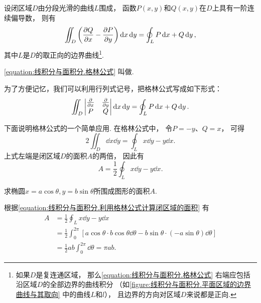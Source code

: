 \begin{theorem}[格林公式]
设闭区域\(D\)由分段光滑的曲线\(L\)围成，
函数\(P(x,y)\)和\(Q(x,y)\)在\(D\)上具有一阶连续偏导数，
则有
\begin{equation}\label{equation:线积分与面积分.格林公式}
	\iint_D \left( \pdv{Q}{x} - \pdv{P}{y} \right) \dd{x}\dd{y}
	= \oint_L P\dd{x} + Q\dd{y},
\end{equation}
其中\(L\)是\(D\)的取正向的边界曲线\footnote{%
如果\(D\)是复连通区域，
那么\cref{equation:线积分与面积分.格林公式}
右端应包括沿区域\(D\)的全部边界的曲线积分
（如\cref{figure:线积分与面积分.平面区域的边界曲线与其取向} 中的曲线\(L\)和\(l\)），
且边界的方向对区域\(D\)来说都是正向.}.
\end{theorem}
\cref{equation:线积分与面积分.格林公式} 叫做.

为了方便记忆，我们可以利用行列式记号，把格林公式写成如下形式：\[
	\iint_D \begin{vmatrix}
		\pdv{x} & \pdv{y} \\
		P & Q
	\end{vmatrix} \dd{x}\dd{y}
	= \oint_L P\dd{x}+Q\dd{y}.
\]

下面说明格林公式的一个简单应用.
在格林公式中，
令\(P=-y\)、\(Q=x\)，
可得\[
	2 \iint_D \dd{x}\dd{y}
	=\oint_L x\dd{y}-y\dd{x}.
\]
上式左端是闭区域\(D\)的面积\(A\)的两倍，
因此有
\begin{equation}\label{equation:线积分与面积分.利用格林公式计算闭区域的面积}
	A = \frac{1}{2} \oint_L x\dd{y}-y\dd{x}.
\end{equation}

\begin{example}
求椭圆\(x = a \cos\theta, y = b \sin\theta\)所围成图形的面积\(A\).
\begin{solution}
根据\cref{equation:线积分与面积分.利用格林公式计算闭区域的面积} 有
\begin{align*}
	A &= \frac{1}{2} \oint_L x\dd{y}-y\dd{x} \\
	&= \frac{1}{2} \int_0^{2\pi} \left[ a \cos\theta \cdot b \cos\theta \dd{\theta}
		- b \sin\theta \cdot (-a \sin\theta) \dd{\theta} \right] \\
	&= \frac{1}{2} ab \int_0^{2\pi} \dd{\theta}
	= \pi ab.
\end{align*}
\end{solution}
\end{example}

